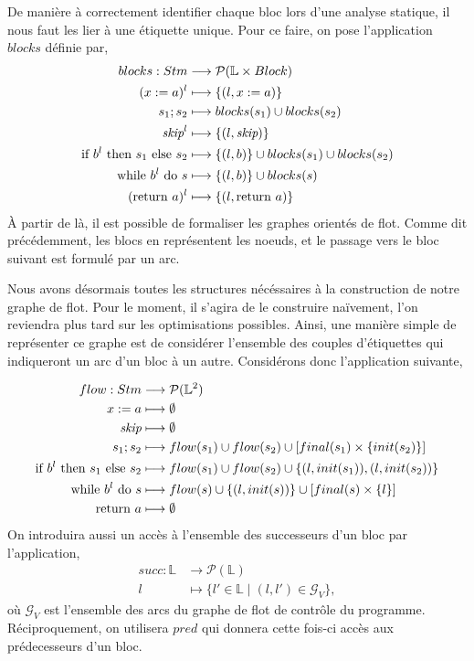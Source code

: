 \documentclass[a4paper, 10pt]{article}
\begin{document}
De manière à correctement identifier chaque bloc lors d'une analyse statique, il nous faut les lier à une étiquette
unique. Pour ce faire, 
on pose l'application $blocks$ définie par,
\begin{align*}
	blocks : Stm &\longrightarrow \mathcal{P}(\mathbb{L} \times Block)\\
	({x}\space:=\space{a})^l&\longmapsto\{(l, x := a)\}\\
	{s_1}\space;\space{s_2} &\longmapsto blocks(s_1) \cup blocks(s_2)\\
	\textit{skip}^l &\longmapsto \{(l, \textit{skip})\}\\
	\text{if }{b^l}\text{ then }{s_1}\text{ else }{s_2} &\longmapsto \{(l, b)\}\cup blocks(s_1)\cup blocks(s_2)\\
	\text{while }{b^l}\text{ do }{s} &\longmapsto \{(l, b)\}\cup blocks(s)\\
	(\text{return }{a})^l &\longmapsto \{(l, \text{return }{a})\}
\end{align*}
À partir de là, il est possible de formaliser les graphes orientés de flot. Comme dit précédemment, les blocs en représentent les noeuds, 
et le passage vers le bloc suivant est formulé par un arc.

Nous avons désormais toutes les structures nécéssaires à la construction de notre graphe de flot. Pour le moment, il s'agira de 
le construire naïvement, l'on reviendra plus tard sur les optimisations possibles. Ainsi, une manière simple de représenter ce 
graphe est de considérer l'ensemble des couples d'étiquettes qui indiqueront un arc d'un bloc à un autre. 
Considérons donc l'application suivante, 

\begin{align*}
	flow : Stm &\longrightarrow \mathcal{P}(\mathbb{L}^2) \\
	{x}\space:=\space{a} &\longmapsto \emptyset \\
	\textit{skip} &\longmapsto \emptyset \\
	{s_1}\space;\space{s_2} &\longmapsto flow(s_1) \cup flow(s_2) \cup [final(s_1)\times\{init(s_2)\}] \\
	\text{if }{b^l}\text{ then }{s_1}\text{ else }{s_2} &\longmapsto flow(s_1)\cup flow(s_2)\cup\{(l, init(s_1)),(l, init(s_2))\} \\
	\text{while }{b^l}\text{ do }{s} &\longmapsto flow(s)\cup\{(l,init(s))\}\cup[final(s)\times\{l\}]\\
	\text{return }{a} &\longmapsto \emptyset
\end{align*}
On introduira aussi un accès à l'ensemble des successeurs d'un bloc par l'application,
\begin{align*}
	succ : \mathbb{L} &\longrightarrow \mathcal{P}(\mathbb{L})\\
	l &\longmapsto \{l' \in \mathbb{L} \mid (l, l') \in \mathcal{G}_V\},
\end{align*}
où $\mathcal{G}_V$ est l'ensemble des arcs du graphe de flot de contrôle du programme. Réciproquement, on 
utilisera $pred$ qui donnera cette fois-ci accès aux prédecesseurs d'un bloc.
\end{document}
